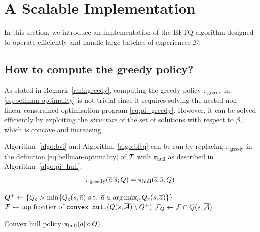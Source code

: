 \documentclass{article}
\begin{document}
\section{A Scalable Implementation}

\label{sec:scalable-bftq}
In this section, we introduce an implementation of the BFTQ algorithm designed to operate efficiently and handle large batches of experiences $\mathcal{D}$.

\subsection{How to compute the greedy policy?}

As stated in Remark~\ref{rmk:greedy}, computing the greedy policy $\pi_\text{greedy}$ in \eqref{eq:bellman-optimality} is not trivial since it requires solving the nested non-linear constrained optimisation program \eqref{eq:pi_greedy}. However, it can be solved efficiently by exploiting the \emph{structure} of the set of solutions with respect to $\beta$, which is concave and increasing. 

\begin{proposition}
\label{prop:bftq_pi_hull}
Algorithm~\ref{algo:bvi} and Algorithm~\ref{algo:bftq} can be run by replacing $\pi_\text{greedy}$ in the definition \eqref{eq:bellman-optimality} of $\mathcal{T}$ with $\pi_\text{hull}$ as described in Algorithm~\ref{algo:pi_hull}.
\begin{equation*}
    \pi_\text{greedy}(\overline{a}|\overline{s}; Q) = \pi_\text{hull}(\overline{a}|\overline{s}; Q)
\end{equation*}
\end{proposition}

\begin{algorithm}
\DontPrintSemicolon
{}
$Q^+\leftarrow \{Q_c > \min \{Q_c(s,\overline{a}) \text{ s.t. }\overline{a}\in\operatorname*{arg\,max}_{\overline{a}} Q_r(s,\overline{a})\} \}$\;
$\mathcal{F} \leftarrow \text{top frontier of }\texttt{convex\_hull}(Q(s,\overline{\mathcal{A}}) \setminus Q^+)$\;
$\mathcal{F}_Q \leftarrow \mathcal{F}\cap Q(s,\overline{\mathcal{A}})$\;
\caption{Convex hull policy $\pi_\text{hull}(\overline{a}|\overline{s}; Q)$}
\label{algo:pi_hull}
\end{algorithm}
\end{document}
